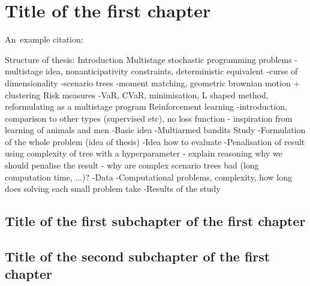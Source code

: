 \chapter{Title of the first chapter}

An~example citation: \cite{Andel07}

%
Structure of thesis:
Introduction
Multistage stochastic programming problems
-multistage idea, nonanticipativity constraints, deterministic equivalent
-curse of dimensionality
-scenario trees 
    -moment matching, geometric brownian motion + clustering
Risk measures
-VaR, CVaR, minimisation, L shaped method, reformulating as a multistage program
Reinforcement learning
-introduction, comparison to other types (supervised etc), no loss function - inspiration from learning of animals and men
-Basic idea
-Multiarmed bandits
Study
-Formulation of the whole problem (idea of thesis)
    -Idea how to evaluate
    -Penalisation of result using complexity of tree with a hyperparameter - explain reasoning why we should penalise the result - why are complex scenario trees bad (long computation time, ...)?
-Data
-Computational problems, complexity, how long does solving each small problem take
-Results of the study

%

\section{Title of the first subchapter of the first chapter}

\section{Title of the second subchapter of the first chapter}
